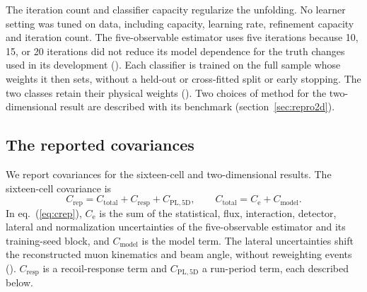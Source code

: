 The iteration count and classifier capacity regularize the unfolding. No learner setting was tuned on data, including capacity, learning rate, refinement capacity and iteration count. The five-observable estimator uses five iterations because 10, 15, or 20 iterations did not reduce its model dependence for the truth changes used in its development (). Each classifier is trained on the full sample whose weights it then sets, without a held-out or cross-fitted split or early stopping. The two classes retain their physical weights (). Two choices of method for the two-dimensional result are described with its benchmark (section~\ref{sec:repro2d}).


\subsection{The reported covariances}
\label{sec:cov16}

We report covariances for the sixteen-cell and two-dimensional results. The sixteen-cell covariance is
\begin{equation}
C_{\mathrm{rep}}=C_{\mathrm{total}}+C_{\mathrm{resp}}+C_{\mathrm{PL,5D}},\qquad C_{\mathrm{total}}=C_{\mathrm{e}}+C_{\mathrm{model}}.
\label{eq:crep}
\end{equation} In eq.~(\ref{eq:crep}), $C_{\mathrm{e}}$ is the sum of the statistical, flux, interaction, detector, lateral and normalization uncertainties of the five-observable estimator and its training-seed block, and $C_{\mathrm{model}}$ is the model term. The lateral uncertainties shift the reconstructed muon kinematics and beam angle, without reweighting events (). $C_{\mathrm{resp}}$ is a recoil-response term and $C_{\mathrm{PL,5D}}$ a run-period term, each described below.

